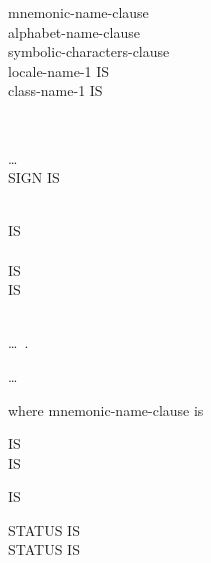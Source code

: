 \begin{0-1}
  \begin{1=}
    mnemonic-name-clause \\
    alphabet-name-clause \\
    symbolic-characters-clause \\
     locale-name-1 IS \literal \\

     class-name-1 IS
    \begin{1=}
      \literal
      \begin{0-1}
        \begin{1=}
           \\
        \end{1=}
        \literal
      \end{0-1}
    \end{1=}\ldots \\

     SIGN IS \literal
    \begin{0-1}
    \end{0-1} \\

     IS  \\
     \\
     IS \identifier \\
      IS \identifier \\
     \\
  \end{1=}\ldots\ {}.
\end{0-1}\ldots

where mnemonic-name-clause is

\mnemonicname
\begin{1=}
  IS  \\
  \integer IS \systemname \\
  \begin{0-1}
    IS \switchname
  \end{0-1}
  \begin{1+}
       STATUS IS \switchstatusname \\
       STATUS IS \switchstatusname
  \end{1+}
\end{1=}

